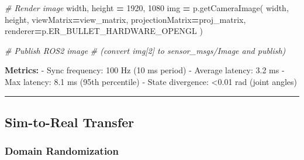 \documentclass[
]{article}
\newenvironment{Shaded}{\begin{snugshade}}{\end{snugshade}}
\newcommand{\CommentTok}[1]{\textcolor[rgb]{0.56,0.35,0.01}{\textit{#1}}}
\newcommand{\DecValTok}[1]{\textcolor[rgb]{0.00,0.00,0.81}{#1}}
\newcommand{\NormalTok}[1]{#1}
\newcommand{\OperatorTok}[1]{\textcolor[rgb]{0.81,0.36,0.00}{\textbf{#1}}}
\begin{document}
\begin{Shaded}
\begin{Highlighting}[]
        \CommentTok{\# Render image}
\NormalTok{        width, height }\OperatorTok{=} \DecValTok{1920}\NormalTok{, }\DecValTok{1080}
\NormalTok{        img }\OperatorTok{=}\NormalTok{ p.getCameraImage(}
\NormalTok{            width, height,}
\NormalTok{            viewMatrix}\OperatorTok{=}\NormalTok{view\_matrix,}
\NormalTok{            projectionMatrix}\OperatorTok{=}\NormalTok{proj\_matrix,}
\NormalTok{            renderer}\OperatorTok{=}\NormalTok{p.ER\_BULLET\_HARDWARE\_OPENGL}
\NormalTok{        )}

        \CommentTok{\# Publish ROS2 image}
        \CommentTok{\# (convert img[2] to sensor\_msgs/Image and publish)}
\end{Highlighting}
\end{Shaded}

\textbf{Metrics:} - Sync frequency: 100 Hz (10 ms period) - Average
latency: 3.2 ms - Max latency: 8.1 ms (95th percentile) - State
divergence: \textless0.01 rad (joint angles)

\begin{center}\rule{0.5\linewidth}{0.5pt}\end{center}

\hypertarget{sim-to-real-transfer}{%
\subsection{Sim-to-Real Transfer}\label{sim-to-real-transfer}}

\hypertarget{domain-randomization}{%
\subsubsection{Domain Randomization}\label{domain-randomization}}
\end{document}

